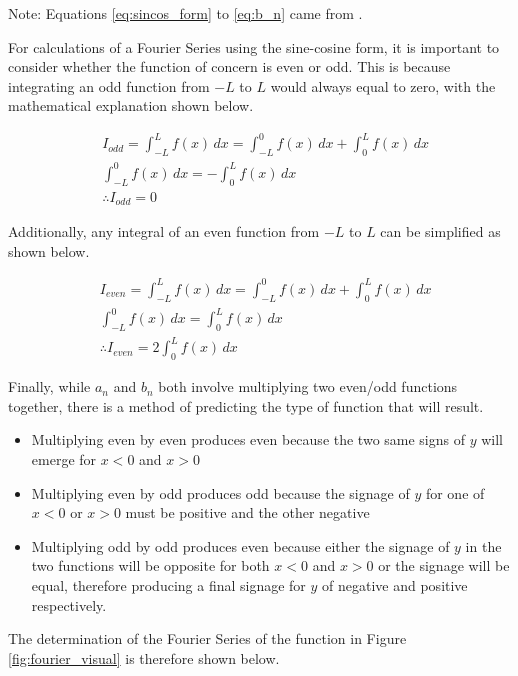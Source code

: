 \documentclass[letterpaper, 12pt]{article}
\begin{document}
Note: Equations \ref*{eq:sincos_form} to \ref*{eq:b_n} came from \cite{tisdellHowComputeFourier2009}.

For calculations of a Fourier Series using the sine-cosine form,
it is important to consider whether the function of concern
is even or odd. This is because integrating an odd function
from \(-L\) to \(L\) would always equal to zero,
with the mathematical explanation shown below.

\begin{align*}
     & I_{odd} = \int_{-L}^{L} f(x) \,dx = \int_{-L}^{0} f(x) \,dx + \int_{0}^{L} f(x) \,dx
    \\
     & \int_{-L}^{0} f(x) \,dx = -\int_{0}^{L} f(x) \,dx
    \\
     & \therefore I_{odd} = 0
\end{align*}

Additionally, any integral of an even function from \(-L\) to \(L\) can be simplified
as shown below.

\begin{align*}
     & I_{even} = \int_{-L}^{L} f(x) \,dx = \int_{-L}^{0} f(x) \,dx + \int_{0}^{L} f(x) \,dx
    \\
     & \int_{-L}^{0} f(x) \,dx = \int_{0}^{L} f(x) \,dx
    \\
     & \therefore I_{even} = 2\int_{0}^{L} f(x) \,dx
\end{align*}

Finally, while \(a_n\) and \(b_n\) both involve multiplying
two even/odd functions together, there is a method of
predicting the type of function that will result.

\begin{itemize}
    \item Multiplying even by even produces even because the two same signs of \(y\) will emerge for \(x < 0\) and \(x > 0\)
    \item Multiplying even by odd produces odd because the signage of \(y\) for one of \(x < 0\) or \(x > 0\) must be positive and the other negative
    \item Multiplying odd by odd produces even because either the signage of \(y\) in the two functions will be opposite for both \(x < 0\) and \(x > 0\) or the signage will be equal, therefore producing a final signage for \(y\) of negative and positive respectively.
\end{itemize}

The determination of the Fourier Series of the function in Figure \ref*{fig:fourier_visual}
is therefore shown below.
\end{document}
